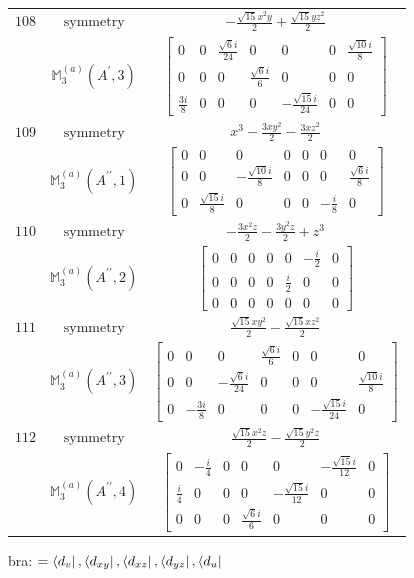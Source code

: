 \documentclass[fleqn,8pt,landscape]{jsarticle}
\begin{document}
\begin{longtable}{ccc}
$ 108 $ & $ \text{symmetry} $ & $ - \frac{\sqrt{15} x^{2} y}{2} + \frac{\sqrt{15} y z^{2}}{2} $ \\
$  $ & $ \mathbb{M}_{3}^{(a)}(A^{\prime},3) $ & $ \begin{bmatrix} 0 & 0 & \frac{\sqrt{6} i}{24} & 0 & 0 & 0 & \frac{\sqrt{10} i}{8} \\ 0 & 0 & 0 & \frac{\sqrt{6} i}{6} & 0 & 0 & 0 \\ \frac{3 i}{8} & 0 & 0 & 0 & - \frac{\sqrt{15} i}{24} & 0 & 0 \end{bmatrix} $ \\ \hline
$ 109 $ & $ \text{symmetry} $ & $ x^{3} - \frac{3 x y^{2}}{2} - \frac{3 x z^{2}}{2} $ \\
$  $ & $ \mathbb{M}_{3}^{(a)}(A^{\prime\prime},1) $ & $ \begin{bmatrix} 0 & 0 & 0 & 0 & 0 & 0 & 0 \\ 0 & 0 & - \frac{\sqrt{10} i}{8} & 0 & 0 & 0 & \frac{\sqrt{6} i}{8} \\ 0 & \frac{\sqrt{15} i}{8} & 0 & 0 & 0 & - \frac{i}{8} & 0 \end{bmatrix} $ \\ \hline
$ 110 $ & $ \text{symmetry} $ & $ - \frac{3 x^{2} z}{2} - \frac{3 y^{2} z}{2} + z^{3} $ \\
$  $ & $ \mathbb{M}_{3}^{(a)}(A^{\prime\prime},2) $ & $ \begin{bmatrix} 0 & 0 & 0 & 0 & 0 & - \frac{i}{2} & 0 \\ 0 & 0 & 0 & 0 & \frac{i}{2} & 0 & 0 \\ 0 & 0 & 0 & 0 & 0 & 0 & 0 \end{bmatrix} $ \\ \hline
$ 111 $ & $ \text{symmetry} $ & $ \frac{\sqrt{15} x y^{2}}{2} - \frac{\sqrt{15} x z^{2}}{2} $ \\
$  $ & $ \mathbb{M}_{3}^{(a)}(A^{\prime\prime},3) $ & $ \begin{bmatrix} 0 & 0 & 0 & \frac{\sqrt{6} i}{6} & 0 & 0 & 0 \\ 0 & 0 & - \frac{\sqrt{6} i}{24} & 0 & 0 & 0 & \frac{\sqrt{10} i}{8} \\ 0 & - \frac{3 i}{8} & 0 & 0 & 0 & - \frac{\sqrt{15} i}{24} & 0 \end{bmatrix} $ \\ \hline
$ 112 $ & $ \text{symmetry} $ & $ \frac{\sqrt{15} x^{2} z}{2} - \frac{\sqrt{15} y^{2} z}{2} $ \\
$  $ & $ \mathbb{M}_{3}^{(a)}(A^{\prime\prime},4) $ & $ \begin{bmatrix} 0 & - \frac{i}{4} & 0 & 0 & 0 & - \frac{\sqrt{15} i}{12} & 0 \\ \frac{i}{4} & 0 & 0 & 0 & - \frac{\sqrt{15} i}{12} & 0 & 0 \\ 0 & 0 & 0 & \frac{\sqrt{6} i}{6} & 0 & 0 & 0 \end{bmatrix} $ \\ \hline
\end{longtable}
bra: $=\bra{d_{v}}, \bra{d_{xy}}, \bra{d_{xz}}, \bra{d_{yz}}, \bra{d_{u}}$
\end{document}
